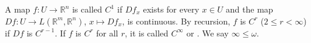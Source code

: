 A map $f: U \to \mathbb{R}^n$ is called $C^1$ if $Df_x$ exists for every $x \in U$ and the map $Df: U \to L(\mathbb{R}^m, \mathbb{R}^n)$, $x \mapsto Df_x$, is continuous. By recursion, $f$ is $C^r$ ($2 \leqslant r < \infty$) if $Df$ is $C^{r-1}$. If $f$ is $C^r$ for all $r$, it is called $C^{\infty}$ or . We say $\infty \leqslant \omega$.
